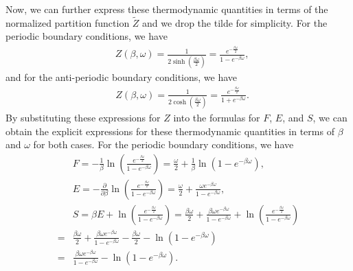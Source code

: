 Now, we can further express these thermodynamic quantities in terms of the normalized partition function $\tilde{Z}$ and we drop the tilde for simplicity. For the periodic boundary conditions, we have
\begin{align}
    &Z(\beta, \omega) = \frac{1}{2\sinh\left( \frac{\beta \omega} {2} \right)}= \frac{e^{-\frac{\beta \omega}{2}}}{1 - e^{-\beta \omega}},
\end{align}
and for the anti-periodic boundary conditions, we have
\begin{align}
    &Z(\beta, \omega) = \frac{1}{2\cosh\left( \frac{\beta \omega} {2} \right)}= \frac{e^{-\frac{\beta \omega}{2}}}{1 + e^{-\beta \omega}}.
\end{align}
By substituting these expressions for $Z$ into the formulas for $F$, $E$, and $S$, we can obtain the explicit expressions for these thermodynamic quantities in terms of $\beta$ and $\omega$ for both cases. For the periodic boundary conditions, we have
\begin{align}
    &F = -\frac{1}{\beta} \ln \left( \frac{e^{-\frac{\beta \omega}{2}}}{1 - e^{-\beta \omega}} \right) = \frac{\omega}{2} + \frac{1}{\beta} \ln \left( 1 - e^{-\beta \omega} \right),\\
    &E = -\frac{\partial}{\partial \beta} \ln \left( \frac{e^{-\frac{\beta \omega}{2}}}{1 - e^{-\beta \omega}} \right) = \frac{\omega}{2} + \frac{\omega e^{-\beta \omega}}{1 - e^{-\beta \omega}},\\
    &S = \beta E + \ln \left( \frac{e^{-\frac{\beta \omega}{2}}}{1 - e^{-\beta \omega}} \right) = \frac{\beta \omega}{2} + \frac{\beta \omega e^{-\beta \omega}}{1 - e^{-\beta \omega}} + \ln \left( \frac{e^{-\frac{\beta \omega}{2}}}{1 - e^{-\beta \omega}} \right)\\
    =& \frac{\beta \omega}{2} + \frac{\beta \omega e^{-\beta \omega}}{1 - e^{-\beta \omega}} - \frac{\beta \omega}{2} - \ln \left( 1 - e^{-\beta \omega} \right)\\
    =& \frac{\beta \omega e^{-\beta \omega}}{1 - e^{-\beta \omega}} - \ln \left( 1 - e^{-\beta \omega} \right).
\end{align}

